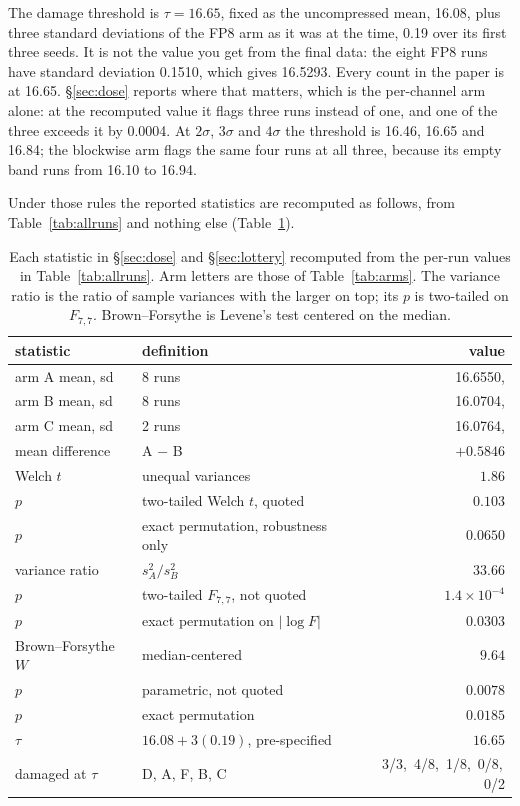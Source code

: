 \documentclass[11pt,letterpaper]{article}
\begin{document}
\medskip
The damage threshold is $\tau = 16.65$, fixed as the uncompressed mean, 16.08, plus three standard deviations of the FP8 arm as it was at the time, 0.19 over its first three seeds. It is not the value you get from the final data: the eight FP8 runs have standard deviation 0.1510, which gives 16.5293. Every count in the paper is at 16.65. \S\ref{sec:dose} reports where that matters, which is the per-channel arm alone: at the recomputed value it flags three runs instead of one, and one of the three exceeds it by 0.0004. At $2\sigma$, $3\sigma$ and $4\sigma$ the threshold is 16.46, 16.65 and 16.84; the blockwise arm flags the same four runs at all three, because its empty band runs from 16.10 to 16.94.

\medskip
Under those rules the reported statistics are recomputed as follows, from Table~\ref{tab:allruns} and nothing else (Table~\ref{tab:recompute}).

\begin{table}[htbp]
\centering
\footnotesize
\caption{Each statistic in \S\ref{sec:dose} and \S\ref{sec:lottery} recomputed from the per-run values in Table~\ref{tab:allruns}. Arm letters are those of Table~\ref{tab:arms}. The variance ratio is the ratio of sample variances with the larger on top; its $p$ is two-tailed on $F_{7,7}$. Brown--Forsythe is Levene's test centered on the median.}
\label{tab:recompute}
\begin{tabular}{llr}
\toprule
statistic & definition & value \\
\midrule
arm A mean, sd & 8 runs & 16.6550,\; 0.8759 \\
arm B mean, sd & 8 runs & 16.0704,\; 0.1510 \\
arm C mean, sd & 2 runs & 16.0764,\; 0.0067 \\
\midrule
mean difference & A $-$ B & $+0.5846$ \\
Welch $t$ & unequal variances & $1.86$ \\
$p$ & two-tailed Welch $t$, quoted & $0.103$ \\
$p$ & exact permutation, robustness only & $0.0650$ \\
\midrule
variance ratio & $s_A^2 / s_B^2$ & $33.66$ \\
$p$ & two-tailed $F_{7,7}$, not quoted & $1.4\times10^{-4}$ \\
$p$ & exact permutation on $|\log F|$ & $0.0303$ \\
Brown--Forsythe $W$ & median-centered & $9.64$ \\
$p$ & parametric, not quoted & $0.0078$ \\
$p$ & exact permutation & $0.0185$ \\
\midrule
$\tau$ & $16.08 + 3(0.19)$, pre-specified & $16.65$ \\
damaged at $\tau$ & D, A, F, B, C & 3/3,\, 4/8,\, 1/8,\, 0/8,\, 0/2 \\
\bottomrule
\end{tabular}
\end{table}
\end{document}
